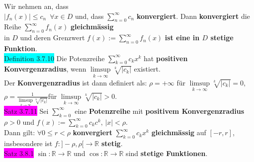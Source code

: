 \documentclass[10pt]{article}
\begin{document}
                Wir nehmen an, dass \\
        \indent \textcolor{NavyBlue}{$|f_n(x)|\leqslant c_n\enspace\forall x\in D$}
                und, dass \textcolor{NavyBlue}{$\sum_{n=0}^\infty c_n$} \textbf{konvergiert}. 
                Dann \textbf{konvergiert} die Reihe 
                \textcolor{NavyBlue}{$\sum_{n=0}^\infty f_n(x)$} \textbf{gleichmässig} \\
        \indent in $D$ und deren 
                Grenzwert \textcolor{NavyBlue}{$f(x):=\sum_{n=0}^\infty f_n(x)$} 
                \textbf{ist eine in $D$ stetige Funktion}.\\
\colorbox{cyan}{Definition 3.7.10} Die Potenzreihe 
                \textcolor{NavyBlue}{$\sum_{k=0}^\infty c_kx^k$}
                hat \textbf{positiven Konvergenzradius}, wenn 
                \textcolor{NavyBlue}{$\limsup\limits_{k\to\infty}\sqrt[k]{|c_k|}$} 
                existiert. \\
        \indent Der \textbf{Konvergenzradius} ist dann definiert als: 
                \textcolor{NavyBlue}{$\rho=+\infty$} \qquad\qquad für
                \textcolor{NavyBlue}{$\limsup\limits_{k\to\infty}\sqrt[k]{|c_k|}=0$},\\
        \indent\indent\indent\qquad\qquad\qquad\qquad\qquad\qquad\qquad\qquad\enspace\enspace
                \textcolor{NavyBlue}{
                $\rho=\frac{1}{\limsup\limits_{k\to\infty}\sqrt[k]{|c_k|}}$}\quad für
                \textcolor{NavyBlue}{$\limsup\limits_{k\to\infty}\sqrt[k]{|c_k|}>0$}.\\
\colorbox{magenta}{Satz 3.7.11} Sei \textcolor{NavyBlue}{$\sum_{k=0}^\infty$}
                eine \textbf{Potenzreihe} mit 
                \textbf{positivem Konvergenzradius} 
                \textcolor{NavyBlue}{$\rho>0$} und  
                \textcolor{NavyBlue}{$f(x):=\sum_{k=0}^\infty c_kc^k,\,|x|<\rho$}. \\
        \indent Dann gilt: \textcolor{NavyBlue}{$\forall0\leqslant r<\rho$} 
                \textbf{konvergiert} 
                \textcolor{NavyBlue}{$\sum_{k=0}^\infty c_kx^k$} 
                \textbf{gleichmässig} auf \textcolor{NavyBlue}{$[-r,r]$}, insbesondere 
                ist \textcolor{NavyBlue}{$f:]-\rho,\rho[\longrightarrow\mathbb{R}$} 
                \textbf{stetig}.\\
\colorbox{magenta}{Satz 3.8.1} \textcolor{NavyBlue}{$\sin:\mathbb{R}\longrightarrow\mathbb{R}$} 
                und 
                \textcolor{NavyBlue}{$\cos:\mathbb{R}\longrightarrow\mathbb{R}$} 
                sind \textbf{stetige Funktionen}.\\
\end{document}
